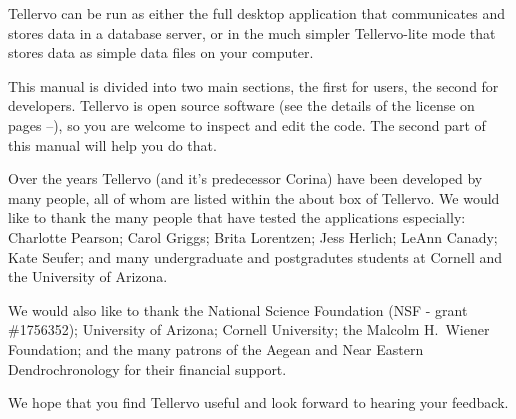 Tellervo can be run as either the full desktop application that communicates and stores data in a database server, or in the much simpler Tellervo-lite mode that stores data as simple data files on your computer.

This manual is divided into two main sections, the first for users, the second for developers.  Tellervo is open source software (see the details of the license on pages \pageref{txt:licenseStart}--\pageref{txt:licenseEnd}), so you are welcome to inspect and edit the code.  The second part of this manual will help you do that.

Over the years Tellervo (and it's predecessor Corina) have been developed by many people, all of whom are listed within the about box of Tellervo.  We would like to thank the many people that have tested the applications especially: Charlotte Pearson; Carol Griggs; Brita Lorentzen; Jess Herlich; LeAnn Canady; Kate Seufer; and many undergraduate and postgradutes students at Cornell and the University of Arizona.  

We would also like to thank the National Science Foundation (NSF - grant \#1756352); University of Arizona; Cornell University; the Malcolm H.\ Wiener Foundation; and the many patrons of the Aegean and Near Eastern Dendrochronology for their financial support.  

We hope that you find Tellervo useful and look forward to hearing your feedback.  


